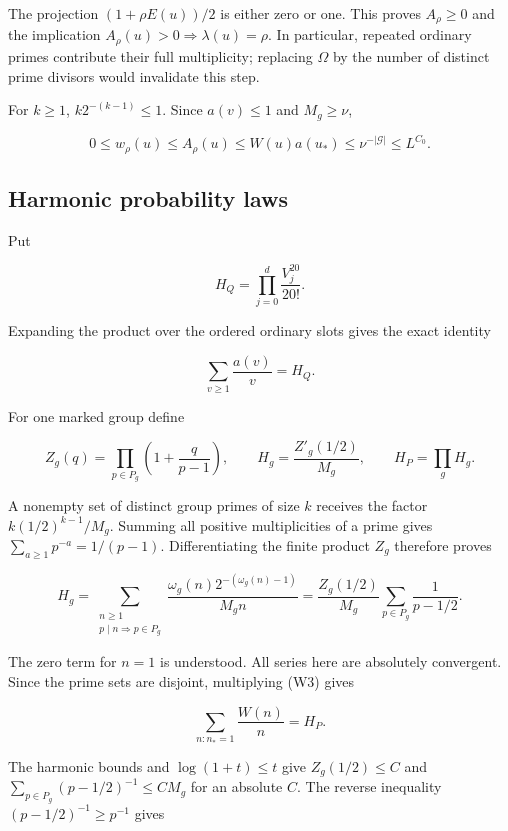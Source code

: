 The projection \((1+\rho E(u))/2\) is either zero or one. This proves
\(A_\rho\ge0\) and the implication
\(A_\rho(u)>0\Rightarrow\lambda(u)=\rho\). In particular, repeated
ordinary primes contribute their full multiplicity; replacing \(\Omega\)
by the number of distinct prime divisors would invalidate this step.

For \(k\ge1\), \(k2^{-(k-1)}\le1\). Since \(a(v)\le1\) and
\(M_g\ge\nu\),

\[
0\le w_\rho(u)\le A_\rho(u)\le W(u)a(u_*)
 \le\nu^{-|\mathcal G|}\le L^{C_0}. \tag{W1}
\]


\hypertarget{weights-harmonic-probability-laws}{%
\subsection{Harmonic probability
laws}\label{weights-harmonic-probability-laws}}

Put

\[
H_Q=\prod_{j=0}^d\frac{V_j^{20}}{20!}.
\]

Expanding the product over the ordered ordinary slots gives the exact
identity

\[
\sum_{v\ge1}\frac{a(v)}v=H_Q. \tag{W2}
\]

For one marked group define

\[
Z_g(q)=\prod_{p\in P_g}\left(1+\frac q{p-1}\right),\qquad
H_g=\frac{Z'_g(1/2)}{M_g},\qquad H_P=\prod_gH_g.
\]

A nonempty set of distinct group primes of size \(k\) receives the
factor \(k(1/2)^{k-1}/M_g\). Summing all positive multiplicities of a
prime gives \(\sum_{a\ge1}p^{-a}=1/(p-1)\). Differentiating the finite
product \(Z_g\) therefore proves

\[
H_g=\sum_{\substack{n\ge1\\p\mid n\Rightarrow p\in P_g}}
 \frac{\omega_g(n)2^{-(\omega_g(n)-1)}}{M_gn}
 =\frac{Z_g(1/2)}{M_g}\sum_{p\in P_g}\frac1{p-1/2}.
 \tag{W3}
\]

The zero term for \(n=1\) is understood. All series here are absolutely
convergent. Since the prime sets are disjoint, multiplying (W3) gives

\[
\sum_{n:n_*=1}\frac{W(n)}n=H_P. \tag{W4}
\]

The harmonic bounds and \(\log(1+t)\le t\) give \(Z_g(1/2)\le C\) and
\(\sum_{p\in P_g}(p-1/2)^{-1}\le C M_g\) for an absolute \(C\). The
reverse inequality \((p-1/2)^{-1}\ge p^{-1}\) gives

